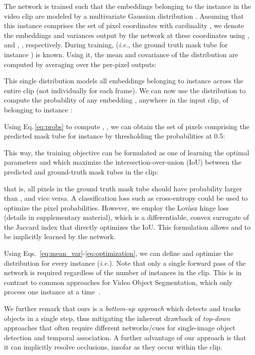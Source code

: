 \documentclass[runningheads]{llncs}
\makeatletter
\newcommand*{\ie}{\emph{i.e.}\@\xspace}
\newcommand{\refequ}[1]{Eq.\,\ref{eq:#1}}
\newcommand{\PAR}[1]{\vskip4pt \noindent {\bf #1~}}
\makeatother
\begin{document}
\PAR{Instance representation:} The network is trained such that the embeddings belonging to the  instance in the video clip are modeled by a multivariate Gaussian distribution . 
Assuming that this instance comprises the set of pixel coordinates  with cardinality , we denote the embeddings and variances output by the network at these coordinates using 
,  
and 
, , respectively.
During training,  (\ie, the ground truth mask tube for instance ) is known. Using it, the mean  and covariance  of the distribution are computed by averaging over the per-pixel outputs:


This single distribution models all embeddings belonging to instance  across the entire clip (not individually for each frame).
We can now use the distribution  to compute the probability  of any embedding , anywhere in the input clip, of belonging to instance :

Using \refequ{probs} to compute , , we can obtain the set of pixels  comprising the predicted mask tube for instance  by thresholding the probabilities at 0.5:


\PAR{Training:} This way, the training objective can be formulated as one of learning the optimal parameters  and  which maximize the intersection-over-union (IoU) between the predicted and ground-truth mask tubes in the clip: 


that is, all pixels in the ground truth mask tube  should have probability larger than , and vice versa. A classification loss such as cross-entropy could be used to optimize the pixel probabilities. However, we employ the Lov\`{a}sz hinge loss~\cite{Berman18CVPR,Berman18CVPR2,Neven19CVPR,Yu2015ICML} (details in supplementary material), which is a differentiable, convex surrogate of the Jaccard index that directly optimizes the IoU. This formulation allows  and  to be implicitly learned by the network. 

Using Eqs.~\ref{eq:mean_var}-\ref{eq:optimization}, we can define and optimize the distribution for every instance (\ie ). Note that only a single forward pass of the network is required regardless of the number of instances in the clip.
This is in contrast to common approaches for Video Object Segmentation, which only process one instance at a time~\cite{Oh2019ICCV,Wug2018CVPR}.

We further remark that ours is a \textit{bottom-up approach} which detects and tracks objects in a single step, thus mitigating the inherent drawback of \textit{top-down} approaches that often require different networks/cues for single-image object detection and temporal association. A further advantage of our approach is that it can implicitly resolve occlusions, insofar as they occur within the clip. 
\end{document}
